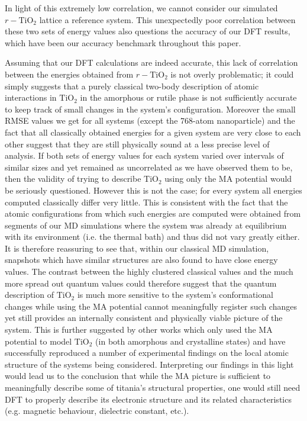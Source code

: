 \documentclass[aps,prb,twocolumn,amsmath,amssymb,superscriptaddress,longbibliography]{revtex4-1}
\newcommand\tab[1][1cm]{\hspace*{#1}} %
\begin{document}
In light of this extremely low correlation, we cannot consider our simulated $r-\text{TiO}_2$ lattice a reference system.
This unexpectedly poor correlation between these two sets of energy values also questions the accuracy of our DFT results, which have been our accuracy benchmark throughout this paper.

\tab Assuming that our DFT calculations are indeed accurate, this lack of correlation between the energies obtained from $r-\text{TiO}_2$ is not overly problematic; it could simply suggests that a purely classical two-body description of atomic interactions in $\text{TiO}_2$ in the amorphous or rutile phase is not sufficiently accurate to keep track of small changes in the system's configuration.
Moreover the small RMSE values we get for all systems (except the 768-atom nanoparticle) and the fact that all classically obtained energies for a given system are very close to each other suggest that they are still physically sound at a less precise level of analysis.
If both sets of energy values for each system varied over intervals of similar sizes and yet remained as uncorrelated as we have observed them to be, then the validity of trying to describe $\text{TiO}_2$ using only the MA potential would be seriously questioned.
However this is not the case; for every system all energies computed classically differ very little.
This is consistent with the fact that the atomic configurations from which such energies are computed were obtained from segments of our MD simulations where the system was already at equilibrium with its environment (i.e. the thermal bath) and thus did not vary greatly either.
It is therefore reassuring to see that, within our classical MD simulation, snapshots which have similar structures are also found to have close energy values. 
The contrast between the highly clustered classical values and the much more spread out quantum values could therefore suggest that the quantum description of $\text{TiO}_2$ is much more sensitive to the system's conformational changes while using the MA potential cannot meaningfully register such changes yet still provides an internally consistent and physically viable picture of the system.
This is further suggested by other works which only used the MA potential to model $\text{TiO}_2$ (in both amorphous and crystalline states) and have successfully reproduced a number of experimental findings on the local atomic structure of the systems being considered\cite{vvh1,vvh2,fichtorn}.
Interpreting our findings in this light would lead us to the conclusion that while the MA picture is sufficient to meaningfully describe some of titania's structural properties, one would still need DFT to properly describe its electronic structure and its related characteristics (e.g. magnetic behaviour, dielectric constant, etc.). 
\end{document}
